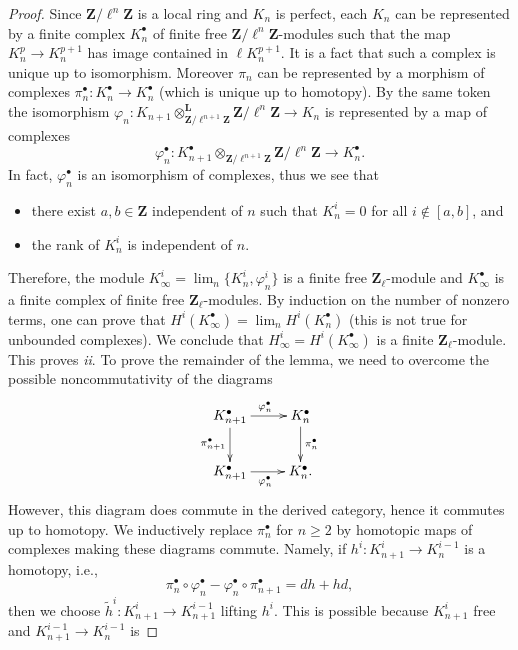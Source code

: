 \documentclass{stacks-project}
\theoremstyle{plain}
\theoremstyle{definition}
\theoremstyle{remark}
\numberwithin{equation}{subsection}
\def\lim{\mathop{\mathrm{lim}}\nolimits}
\begin{document}
\begin{proof}
Since $\mathbf{Z}/\ell^n\mathbf{Z}$ is a local ring and $K_n$ is perfect, each
$K_n$ can be represented by a finite complex $K_n^\bullet$ of finite free
$\mathbf{Z}/\ell^n \mathbf{Z}$-modules such that the map $K_n^p \to K_n^{p+1}$
has image contained in $\ell K_n^{p+1}$. It is a fact that such a complex is
unique up to isomorphism. Moreover $\pi_n$ can be represented by a morphism of
complexes $\pi_n^\bullet : K_n^\bullet\to K_n^\bullet$ (which is unique up to
homotopy). By the same token the isomorphism
$\varphi_n : K_{n+1} \otimes_{\mathbf{Z}/\ell^{n+1}\mathbf{Z}}^{\mathbf{L}}
\mathbf{Z}/\ell^n\mathbf{Z}\to K_n$ is represented by a map of complexes
$$
\varphi_n^\bullet :
K_{n+1}^\bullet
\otimes_{\mathbf{Z}/\ell^{n+1}\mathbf{Z}}
\mathbf{Z}/\ell^n\mathbf{Z} \to K_n^\bullet.
$$
In fact, $\varphi_n^\bullet$ is an isomorphism of complexes, thus we see that
\begin{itemize}
\item
there exist $a, b\in \mathbf{Z}$ independent of $n$ such that $K_n^i = 0$ for
all $i\notin[a, b]$, and
\item
the rank of $K_n^i$ is independent of $n$.
\end{itemize}
Therefore, the module $K_\infty^i = \lim_n \{K_n^i, \varphi_n^i\}$ is a
finite free $\mathbf{Z}_\ell$-module and $K_\infty^\bullet$ is a finite complex
of finite free $\mathbf{Z}_\ell$-modules. By induction on the number of nonzero
terms, one can prove that $H^i\left(K_\infty^\bullet\right) = \lim_n
H^i\left(K_n^\bullet\right)$ (this is not true for unbounded complexes). We
conclude that $H_\infty^i = H^i\left(K_\infty^\bullet\right)$ is a finite
$\mathbf{Z}_\ell$-module. This proves {\it ii}. To prove the remainder of the
lemma, we need to overcome the possible noncommutativity of the diagrams
$$
\xymatrix{
{K_{n+1}^\bullet} \ar[d]_{\pi_{n+1}^\bullet} \ar[r]^{\varphi_n^\bullet} &
{K_n^\bullet} \ar[d]^{\pi_n^\bullet} \\
{K_{n+1}^\bullet} \ar[r]_{\varphi_n^\bullet} & {K_n^\bullet.}
}
$$
However, this diagram does commute in the derived category, hence it commutes
up to homotopy. We inductively replace $\pi_n^\bullet$ for $n\geq 2$ by
homotopic maps of complexes making these diagrams commute. Namely, if $h^i :
K_{n+1}^i \to K_n^{i-1}$ is a homotopy, i.e.,
$$
\pi_n^\bullet \circ \varphi_n^\bullet -
\varphi_n^\bullet \circ \pi_{n + 1}^\bullet = dh + hd,
$$
then we choose $\tilde h^i : K_{n+1}^i\to K_{n+1}^{i-1}$ lifting $h^i$. This is
possible because $K_{n+1}^i$ free and $K_{n+1}^{i-1}\to K_n^{i-1}$ is

\end{proof}
\end{document}
